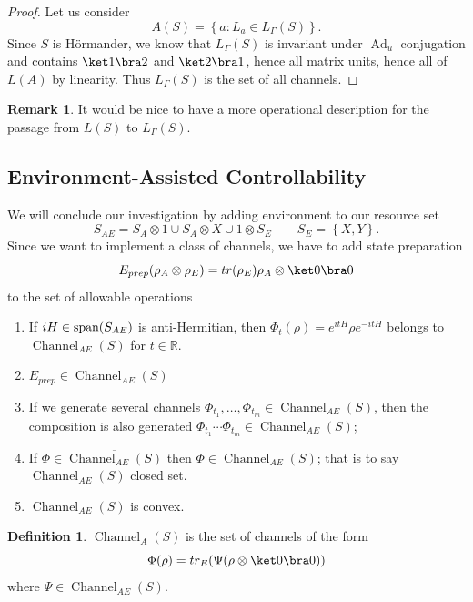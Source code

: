 \documentclass[11pt,reqno]{amsart}
\theoremstyle{definition}
\newtheorem{definition}[theorem]{Definition}
\newtheorem{remark}[theorem]{Remark}
\newcommand{\mb}{\mathbb}
\newcommand{\lset}{\left\{ }
\newcommand{\rset}{\right\} }
\DeclareMathOperator{\Ad}{Ad}
\DeclareMathOperator{\chan}{Channel}
\begin{document}
\begin{proof}
    Let us consider
    \[ A(S) = \lset a : L_a\in L_{\Gamma}(S)\rset   .\]  
    Since $S$ is H\"ormander, we know that $L_{\Gamma}(S)$ is invariant under $\Ad_u$ conjugation and contains $\ket 1\bra 2$ and $\ket 2\bra 1$, hence all matrix units, hence all of $L(A)$ by linearity.  Thus $L_{\Gamma}(S)$ is the set of all channels.
\end{proof}


\begin{remark}
    It would be nice to have a more operational description for the passage from $L(S)$ to $L_{\Gamma}(S)$.
\end{remark} 
                              

\subsection{Environment-Assisted Controllability}
We will conclude our investigation by adding environment to our resource set 
 \[  S_{AE} = S_A\otimes 1\cup S_A\otimes X\cup  1\otimes S_E\qquad S_E=\lset X,Y\rset   .\] 
Since we want to implement a class of channels, we have to add state preparation 
 \[ E_{prep}(\rho_A\otimes \rho_E)= tr(\rho_E) \rho_{A}\otimes \ket 0\bra 0 \] 
to the set of allowable operations
\begin{enumerate}
    \item[(UN)] If $iH\in {\rm span}(S_{AE})$ is anti-Hermitian, then $\Phi_t(\rho)=e^{itH}\rho e^{-itH}$ belongs to $\chan_{AE}(S)$ for $t\in \mb R$. 
    \item[(PR)] $E_{prep}\in \chan_{AE}(S)$
    \item[(CO)] If we generate several channels $\Phi_{t_1},\dots ,\Phi_{t_m}\in \chan_{AE}(S)$, then the composition is also generated $\Phi_{t_1}\cdots\Phi_{t_m}\in \chan_{AE}(S)$;
    \item[(CL)] If $ \Phi \in \overline{\chan_{AE}(S)}$ then $ \Phi \in \chan_{AE}(S)$; that is to say $\chan_{AE}(S)$ closed set. 
    \item[(CC)] $\chan_{AE}(S)$ is convex.      
\end{enumerate}
 
 \begin{definition}
    $\chan_A(S)$ is the set of channels of the form
    \[ \Phi(\rho) = tr_E(\Psi(\rho\otimes \ket 0\bra 0)) \] 
    where $\Psi\in \chan_{AE}(S)$.
\end{definition} 
\end{document}
